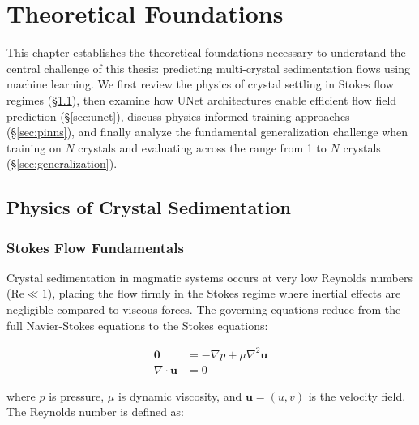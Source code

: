 
\chapter{Theoretical Foundations}
\label{ch:theory}

This chapter establishes the theoretical foundations necessary to understand the central challenge of this thesis: predicting multi-crystal sedimentation flows using machine learning. We first review the physics of crystal settling in Stokes flow regimes (\S\ref{sec:crystal_physics}), then examine how UNet architectures enable efficient flow field prediction (\S\ref{sec:unet}), discuss physics-informed training approaches (\S\ref{sec:pinns}), and finally analyze the fundamental generalization challenge when training on $N$ crystals and evaluating across the range from 1 to $N$ crystals (\S\ref{sec:generalization}).

\section{Physics of Crystal Sedimentation}
\label{sec:crystal_physics}

\subsection{Stokes Flow Fundamentals}

Crystal sedimentation in magmatic systems occurs at very low Reynolds numbers ($\text{Re} \ll 1$), placing the flow firmly in the Stokes regime where inertial effects are negligible compared to viscous forces. The governing equations reduce from the full Navier-Stokes equations to the Stokes equations:

\begin{align}
\mathbf{0} &= -\nabla p + \mu \nabla^2 \mathbf{u} \label{eq:stokes_momentum}\\
\nabla \cdot \mathbf{u} &= 0 \label{eq:stokes_continuity}
\end{align}

where $p$ is pressure, $\mu$ is dynamic viscosity, and $\mathbf{u} = (u, v)$ is the velocity field. The Reynolds number is defined as:

